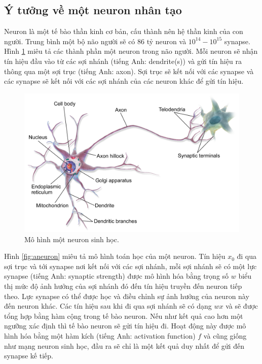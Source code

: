 \subsection{Ý tưởng về một neuron nhân tạo}
Neuron\cite{Suzana:2009} là một tế bào thần kinh cơ bản, cấu thành nên hệ thần kinh của con người. Trung bình một bộ não người sẽ có $86$ tỷ neuron và $10^{14} - 10^{15}$ synapse. Hình \ref{fig:neuron} miêu tả các thành phần một neuron trong não người. Mỗi neuron sẽ nhận tín hiệu đầu vào từ các sợi nhánh (tiếng Anh: dendrite(s)) và gửi tín hiệu ra thông qua một sợi trục (tiếng Anh: axon). Sợi trục sẽ kết nối với các synapse và các synapse sẽ kết nối với các sợi nhánh của các neuron khác để gửi tín hiệu.
\begin{figure}[ht!]
	\centerline{\includegraphics[scale=0.1]{images/neuron.png}}
  	\caption{Mô hình một neuron sinh học.}
  	\label{fig:neuron}
\end{figure}
Hình \ref{fig:aneuron} miêu tả mô hình toán học của một neuron. Tín hiệu $x_0$ đi qua sợi trục và tới synapse nơi kết nối với các sợi nhánh, mỗi sợi nhánh sẽ có một lực synapse (tiếng Anh: synaptic strength) được mô hình hóa bằng trọng số $w$ biểu thị mức độ ảnh hưởng của sợi nhánh đó đến tín hiệu truyền đến neuron tiếp theo. Lực synapse có thể được học và điều chỉnh sự ảnh hưởng của neuron này đến neuron khác. Các tín hiệu sau khi đi qua sợi nhánh sẽ có dạng $wx$ và sẽ được tổng hợp bằng hàm cộng trong tế bào neuron. Nếu như kết quả cao hơn một ngưỡng xác định thì tế bào neuron sẽ gửi tín hiệu đi. Hoạt động này được mô hình hóa bằng một hàm kích (tiếng Anh: activation function) $f$ và cũng giống như mạng neuron sinh học, đầu ra sẽ chỉ là một kết quả duy nhất để gửi đến synapse kế tiếp.
